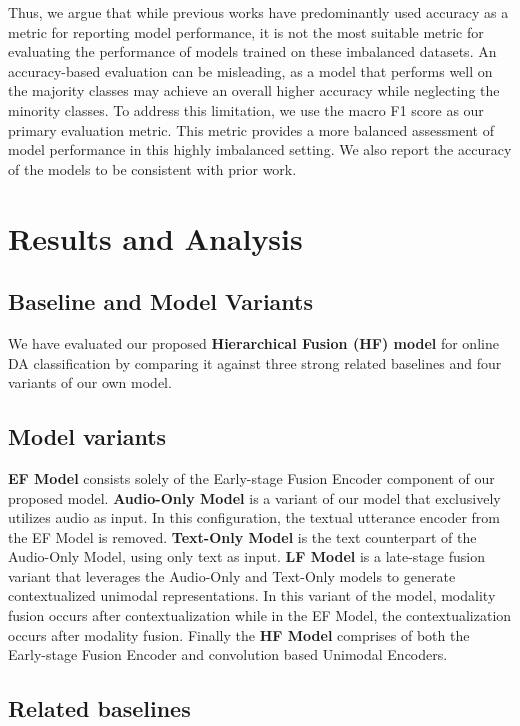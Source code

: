 Thus, we argue that while previous works have predominantly used accuracy as a metric for reporting model performance, it is not the most suitable metric for evaluating the performance of models trained on these imbalanced datasets.
An accuracy-based evaluation can be misleading, as a model that performs well on the majority classes may achieve an overall higher accuracy while neglecting the minority classes. To address this limitation, we use the macro F1 score as our primary evaluation metric.
This metric provides a more balanced assessment of model performance in this highly imbalanced setting.
We also report the accuracy of the models to be consistent with prior work.

\section{Results and Analysis}
\label{sec:results}

\subsection{Baseline and Model Variants}

We have evaluated our proposed \textbf{Hierarchical Fusion (HF) model} for online DA classification by comparing it against three strong related baselines and four variants of our own model.

\subsection*{Model variants}
\label{sec:variants}
\textbf{EF Model} consists solely of the Early-stage Fusion Encoder component of our proposed model. \textbf{Audio-Only Model} is a variant of our model that exclusively utilizes audio as input.
In this configuration, the textual utterance encoder from the EF Model is removed. \textbf{Text-Only Model} is the text counterpart of the Audio-Only Model, using only text as input.
\textbf{LF Model} is a late-stage fusion variant that leverages the Audio-Only and Text-Only models to generate contextualized unimodal representations. In this variant of the model, modality fusion occurs after contextualization while in the EF Model, the contextualization occurs after modality fusion. Finally the \textbf{HF Model} comprises of both the Early-stage Fusion Encoder and convolution based Unimodal Encoders.

\subsection*{Related baselines}

